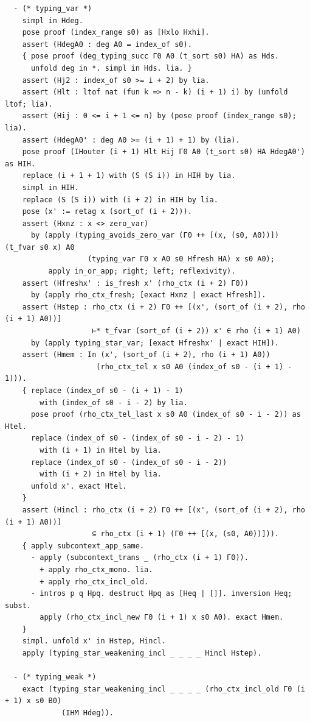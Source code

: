 \begin{latin}
\begin{verbatim}
  - (* typing_var *)
    simpl in Hdeg.
    pose proof (index_range s0) as [Hxlo Hxhi].
    assert (HdegA0 : deg A0 = index_of s0).
    { pose proof (deg_typing_succ Γ0 A0 (t_sort s0) HA) as Hds.
      unfold deg in *. simpl in Hds. lia. }
    assert (Hj2 : index_of s0 >= i + 2) by lia.
    assert (Hlt : ltof nat (fun k => n - k) (i + 1) i) by (unfold ltof; lia).
    assert (Hij : 0 <= i + 1 <= n) by (pose proof (index_range s0); lia).
    assert (HdegA0' : deg A0 >= (i + 1) + 1) by (lia).
    pose proof (IHouter (i + 1) Hlt Hij Γ0 A0 (t_sort s0) HA HdegA0') as HIH.
    replace (i + 1 + 1) with (S (S i)) in HIH by lia.
    simpl in HIH.
    replace (S (S i)) with (i + 2) in HIH by lia.
    pose (x' := retag x (sort_of (i + 2))).
    assert (Hxnz : x <> zero_var)
      by (apply (typing_avoids_zero_var (Γ0 ++ [(x, (s0, A0))]) (t_fvar s0 x) A0
                   (typing_var Γ0 x A0 s0 Hfresh HA) x s0 A0);
          apply in_or_app; right; left; reflexivity).
    assert (Hfreshx' : is_fresh x' (rho_ctx (i + 2) Γ0))
      by (apply rho_ctx_fresh; [exact Hxnz | exact Hfresh]).
    assert (Hstep : rho_ctx (i + 2) Γ0 ++ [(x', (sort_of (i + 2), rho (i + 1) A0))]
                    ⊢* t_fvar (sort_of (i + 2)) x' ∈ rho (i + 1) A0)
      by (apply typing_star_var; [exact Hfreshx' | exact HIH]).
    assert (Hmem : In (x', (sort_of (i + 2), rho (i + 1) A0))
                     (rho_ctx_tel x s0 A0 (index_of s0 - (i + 1) - 1))).
    { replace (index_of s0 - (i + 1) - 1)
        with (index_of s0 - i - 2) by lia.
      pose proof (rho_ctx_tel_last x s0 A0 (index_of s0 - i - 2)) as Htel.
      replace (index_of s0 - (index_of s0 - i - 2) - 1)
        with (i + 1) in Htel by lia.
      replace (index_of s0 - (index_of s0 - i - 2))
        with (i + 2) in Htel by lia.
      unfold x'. exact Htel.
    }
    assert (Hincl : rho_ctx (i + 2) Γ0 ++ [(x', (sort_of (i + 2), rho (i + 1) A0))]
                    ⊆ rho_ctx (i + 1) (Γ0 ++ [(x, (s0, A0))])).
    { apply subcontext_app_same.
      - apply (subcontext_trans _ (rho_ctx (i + 1) Γ0)).
        + apply rho_ctx_mono. lia.
        + apply rho_ctx_incl_old.
      - intros p q Hpq. destruct Hpq as [Heq | []]. inversion Heq; subst.
        apply (rho_ctx_incl_new Γ0 (i + 1) x s0 A0). exact Hmem.
    }
    simpl. unfold x' in Hstep, Hincl.
    apply (typing_star_weakening_incl _ _ _ _ Hincl Hstep).

  - (* typing_weak *)
    exact (typing_star_weakening_incl _ _ _ _ (rho_ctx_incl_old Γ0 (i + 1) x s0 B0)
             (IHM Hdeg)).


\end{verbatim}
\end{latin}

